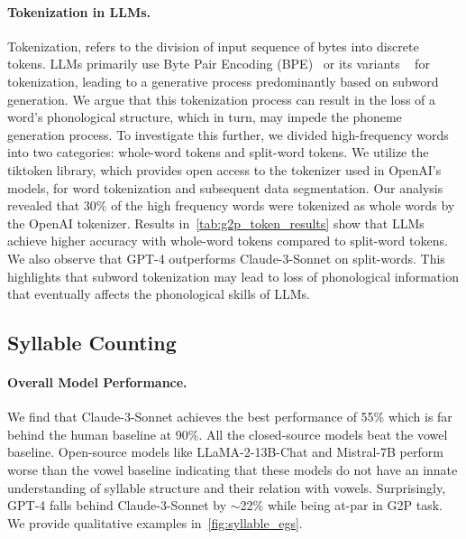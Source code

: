 \paragraph{Tokenization in LLMs.} Tokenization, refers to the division of input sequence of bytes into discrete tokens. LLMs primarily use Byte Pair Encoding (BPE)~\cite{shibata1999byte} or its variants ~\citep{kudo2018sentencepiece} for tokenization, leading to a generative process predominantly based on subword generation. We argue that this tokenization process can result in the loss of a word's phonological structure, which in turn, may impede the phoneme generation process. To investigate this further, we divided high-frequency words into two categories: whole-word tokens and split-word tokens. We utilize the tiktoken library, which provides open access to the tokenizer used in OpenAI's models, for word tokenization and subsequent data segmentation. Our analysis revealed that 30\% of the high frequency words were tokenized as whole words by the OpenAI tokenizer. Results in~\autoref{tab:g2p_token_results} show that LLMs achieve higher accuracy with whole-word tokens compared to split-word tokens. We also observe that GPT-4 outperforms Claude-3-Sonnet on split-words. This highlights that subword tokenization may lead to loss of phonological information that eventually affects the phonological skills of LLMs.

\subsection{Syllable Counting}
\label{sec:syllable_results}

\paragraph{Overall Model Performance.} We find that Claude-3-Sonnet achieves the best performance of 55\% which is far behind the human baseline at 90\%. All the closed-source models beat the vowel baseline. Open-source models like LLaMA-2-13B-Chat and Mistral-7B perform worse than the vowel baseline indicating that these models do not have an innate understanding of syllable structure and their relation with vowels. Surprisingly, GPT-4 falls behind Claude-3-Sonnet by $\sim$22\% while being at-par in G2P task. We provide qualitative examples in~\autoref{fig:syllable_egs}.

